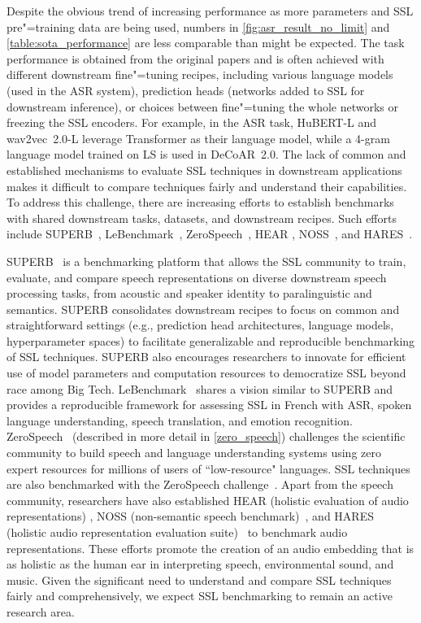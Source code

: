Despite the obvious trend of increasing performance as more parameters and SSL
pre"=training data are being used, numbers in \cref{fig:asr_result_no_limit} 
and \cref{table:sota_performance} are less comparable than might be expected.
The task performance is obtained from the original papers and is often
achieved with different downstream fine"=tuning recipes, including various
language models (used in the ASR system), prediction heads (networks added to
SSL for downstream inference), or choices between fine"=tuning the whole
networks or freezing the SSL encoders. For example, in the ASR task, HuBERT-L
and wav2vec~2.0-L leverage Transformer as their language model, while a 4-gram
language model trained on LS is used in DeCoAR~2.0. The lack of common and
established mechanisms to evaluate SSL techniques in downstream applications
makes it difficult to compare techniques fairly and understand their
capabilities. To address this challenge, there are increasing efforts to establish
benchmarks with shared downstream tasks, datasets, and downstream recipes. Such
efforts include SUPERB~\parencite{yang_superb_2021}, 
LeBenchmark~\parencite{evain_lebenchmark_2021}, ZeroSpeech~\parencite{dunbar_zero_2020},
HEAR \parencite{turian_hear_2022},
NOSS~\parencite{shor_learning_2020}, and HARES~\parencite{wang_learning_2021}. 

SUPERB~\parencite{yang_superb_2021} is a benchmarking platform that allows the
SSL community to train, evaluate, and compare speech representations on
diverse downstream speech processing tasks, from acoustic and speaker identity
to paralinguistic and semantics. SUPERB consolidates downstream recipes to
focus on common and straightforward settings (e.g., prediction head
architectures, language models, hyperparameter spaces) to facilitate generalizable
and reproducible benchmarking of SSL techniques. SUPERB also encourages
researchers to innovate for efficient use of model parameters and computation
resources 
to democratize SSL beyond race among Big Tech.   %
LeBenchmark~\parencite{evain_lebenchmark_2021} shares a vision similar to SUPERB and provides a
reproducible framework for assessing SSL in French with ASR, spoken language
understanding, speech translation, and emotion recognition. 
ZeroSpeech~\parencite{dunbar_zero_2020} (described in more detail in \cref{zero_speech})
challenges the scientific community to build speech and language understanding
systems using zero expert resources 
for millions of users of ``low-resource" languages.
SSL techniques are also benchmarked with the ZeroSpeech 
challenge~\parencite{tjandra_transformer_2020, vanniekerk_vectorquantized_2020}. Apart from the speech
community, researchers have also established HEAR (holistic evaluation of audio
representations) \parencite{turian_hear_2022}, NOSS (non-semantic
speech benchmark)~\parencite{shor_learning_2020}, and HARES (holistic audio
representation evaluation suite)~\parencite{wang_learning_2021} to benchmark audio
representations. These efforts promote the creation of an audio embedding
that is as holistic as the human ear in interpreting speech, environmental
sound, and music. Given the significant need to understand and compare SSL techniques
fairly and comprehensively, we expect SSL benchmarking to remain an
active research area.

